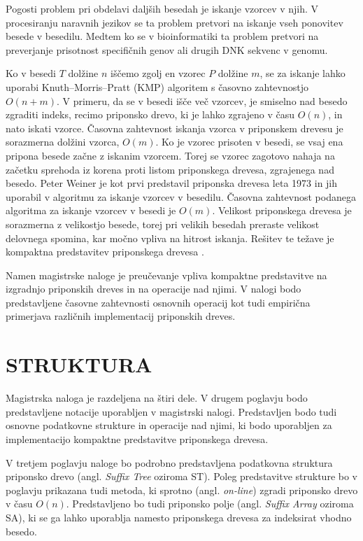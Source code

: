 Pogosti problem pri obdelavi daljših besedah je iskanje vzorcev v njih. V procesiranju naravnih jezikov se ta problem pretvori na iskanje vseh ponovitev besede v besedilu. Medtem ko se v bioinformatiki ta problem pretvori na preverjanje prisotnost specifičnih genov ali drugih DNK sekvenc v genomu. 

Ko v besedi $T$ dolžine $n$ iščemo zgolj en vzorec $P$ dolžine $m$, se za iskanje lahko uporabi Knuth–Morris–Pratt (KMP) algoritem s časovno zahtevnostjo $O(n+m)$.  V primeru, da se v besedi išče več vzorcev, je smiselno nad besedo zgraditi indeks, recimo priponsko drevo, ki je lahko zgrajeno v času $O(n)$, in nato iskati vzorce. Časovna zahtevnost iskanja vzorca v priponskem drevesu je sorazmerna dolžini vzorca, $O(m)$. Ko je vzorec prisoten v besedi, se vsaj ena pripona besede začne z iskanim vzorcem. 
Torej se vzorec zagotovo nahaja na začetku sprehoda iz korena proti listom priponskega drevesa, zgrajenega nad besedo. 
Peter Weiner je kot prvi predstavil priponska drevesa leta 1973 \cite{Weiner1973} in jih uporabil v algoritmu za iskanje vzorcev v besedilu. Časovna zahtevnost podanega algoritma za iskanje vzorcev v besedi je $O(m)$. Velikost priponskega drevesa je sorazmerna z velikostjo besede, torej pri velikih besedah preraste velikost delovnega spomina, kar močno vpliva na hitrost iskanja. Rešitev te težave je kompaktna predstavitev priponskega drevesa \cite{Navarro2016}.

Namen magistrske naloge je preučevanje vpliva kompaktne predstavitve na izgradnjo priponskih dreves in na operacije nad njimi. V nalogi bodo predstavljene  časovne zahtevnosti osnovnih operacij kot tudi empirična primerjava različnih implementacij priponskih dreves.

\section{STRUKTURA}\label{sec:struktura}

Magistrska naloga je razdeljena na štiri dele. V drugem poglavju bodo predstavljene notacije uporabljen v magistrski nalogi. Predstavljen bodo tudi osnovne podatkovne strukture in operacije nad njimi, ki bodo uporabljen za implementacijo kompaktne predstavitve priponskega drevesa.

V tretjem poglavju naloge bo podrobno predstavljena podatkovna struktura priponsko drevo (angl. \textit{Suffix Tree} oziroma ST). Poleg predstavitve strukture bo v poglavju prikazana tudi metoda, ki sprotno (angl. \textit{on-line}) zgradi priponsko drevo v času $O(n)$. Predstavljeno bo tudi priponsko polje (angl. \textit{Suffix Array} oziroma SA), ki se ga lahko uporablja namesto priponskega drevesa za indeksirat vhodno besedo.


